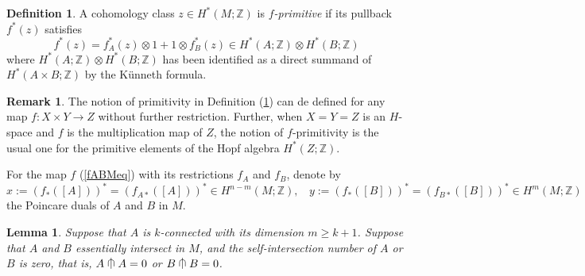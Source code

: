 \documentclass[a4]{amsart}
\newtheorem{lemma}[theorem]{Lemma}
\theoremstyle{definition}
\newtheorem{definition}[theorem]{Definition}
\newtheorem{remark}[theorem]{Remark}
\newcommand{\testcap}{\mathrel{\vcenter{\offinterlineskip
\hbox{$\cap$}\vskip-1.8ex\hbox{$\kern0.2em | \kern0.15em$}}}}
\begin{document}
\begin{sloppypar}
\begin{definition}\label{primdef}
A cohomology class $z\in H^\ast(M;\mathbb{Z})$ is {\it $f$-primitive} if its pullback $f^\ast(z)$ satisfies 
\[
f^\ast(z)=f_A^\ast(z)\otimes 1 + 1\otimes f_B^\ast(z)\in H^\ast(A;\mathbb{Z})\otimes H^\ast(B;\mathbb{Z})
\]  
where $H^\ast(A;\mathbb{Z})\otimes H^\ast(B;\mathbb{Z})$ has been identified as a direct summand of $H^\ast(A\times B;\mathbb{Z})$ by the K\"{u}nneth formula. 
\end{definition}

\begin{remark}\label{prim-rmk}
The notion of primitivity in Definition (\ref{primdef}) can de defined for any map $f:X\times Y\stackrel{}{\longrightarrow} Z$ without further restriction. Further, when $X=Y=Z$ is an $H$-space and $f$ is the multiplication map of $Z$, the notion of $f$-primitivity is the usual one for the primitive elements of the Hopf algebra $H^\ast(Z;\mathbb{Z})$.
\end{remark}

For the map $f$ (\ref{fABMeq}) with its restrictions $f_A$ and $f_B$, denote by 
\[
x:=(f_\ast([A]))^\ast=(f_{A\ast}([A]))^\ast\in H^{n-m}(M;\mathbb{Z}), \ \ \ \ y:=(f_\ast([B]))^\ast=(f_{B\ast}([B]))^\ast\in H^{m}(M;\mathbb{Z})
\]
the Poincare duals of $A$ and $B$ in $M$. 
 
\begin{lemma}\label{int=deglemma}
Suppose that $A$ is $k$-connected with its dimension $m\geq k+1$. Suppose that $A$ and $B$ essentially intersect in $M$, and the self-intersection number of $A$ or $B$ is zero, that is, $A \testcap A=0$ or $B \testcap B=0$. 


\end{lemma}
\end{sloppypar}
\end{document}
